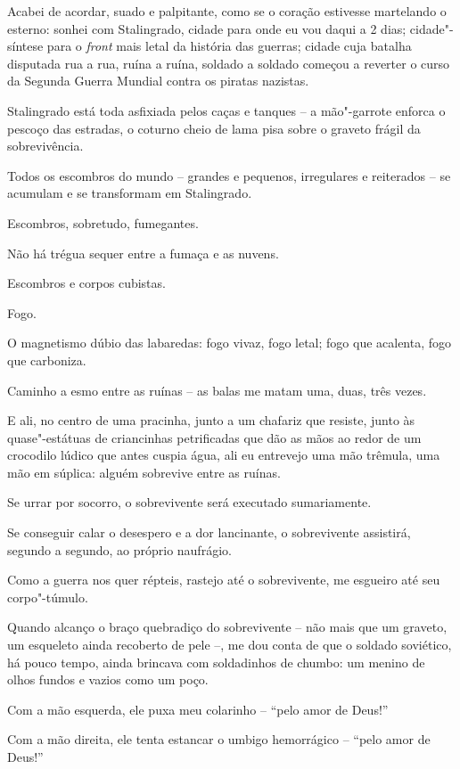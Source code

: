 Acabei de acordar, suado e palpitante, como se o coração estivesse
martelando o esterno: sonhei com Stalingrado, cidade para onde eu vou
daqui a 2 dias; cidade"-síntese para o \emph{front} mais letal da
história das guerras; cidade cuja batalha disputada rua a rua, ruína a
ruína, soldado a soldado começou a reverter o curso da Segunda Guerra
Mundial contra os piratas nazistas.

Stalingrado está toda asfixiada pelos caças e tanques -- a mão"-garrote
enforca o pescoço das estradas, o coturno cheio de lama pisa sobre o
graveto frágil da sobrevivência.

Todos os escombros do mundo -- grandes e pequenos, irregulares e
reiterados -- se acumulam e se transformam em Stalingrado.

Escombros, sobretudo, fumegantes.

Não há trégua sequer entre a fumaça e as nuvens.

Escombros e corpos cubistas.

Fogo.

O magnetismo dúbio das labaredas: fogo vivaz, fogo letal; fogo que
acalenta, fogo que carboniza.

Caminho a esmo entre as ruínas -- as balas me matam uma, duas, três
vezes.

E ali, no centro de uma pracinha, junto a um chafariz que resiste, junto
às quase"-estátuas de criancinhas petrificadas que dão as mãos ao redor
de um crocodilo lúdico que antes cuspia água, ali eu entrevejo uma mão
trêmula, uma mão em súplica: alguém sobrevive entre as ruínas.

Se urrar por socorro, o sobrevivente será executado sumariamente.

Se conseguir calar o desespero e a dor lancinante, o sobrevivente
assistirá, segundo a segundo, ao próprio naufrágio.

Como a guerra nos quer répteis, rastejo até o sobrevivente, me esgueiro
até seu corpo"-túmulo.

Quando alcanço o braço quebradiço do sobrevivente -- não mais que um
graveto, um esqueleto ainda recoberto de pele --, me dou conta de que o
soldado soviético, há pouco tempo, ainda brincava com soldadinhos de
chumbo: um menino de olhos fundos e vazios como um poço.

Com a mão esquerda, ele puxa meu colarinho -- ``pelo amor de Deus!''

Com a mão direita, ele tenta estancar o umbigo hemorrágico -- ``pelo
amor de Deus!''

